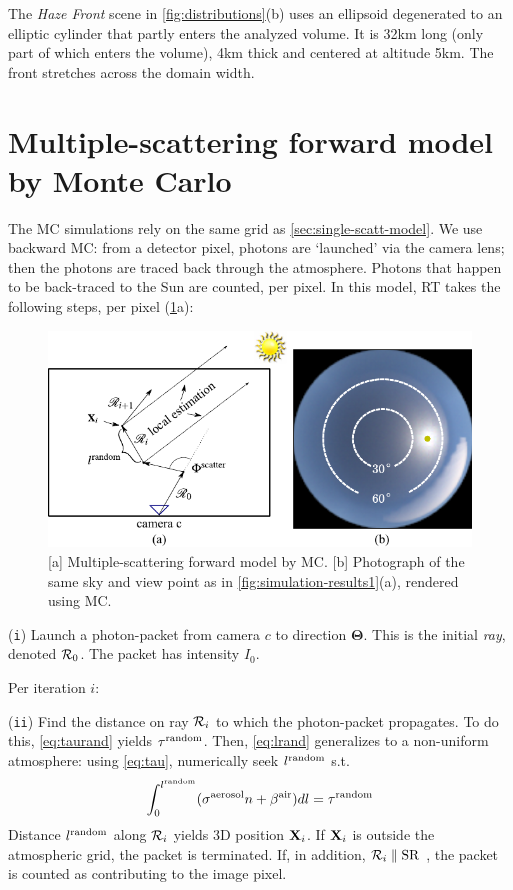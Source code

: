 \documentclass[10pt,letterpaper]{article}
\newcommand{\yoavcomment}[1]{}
\renewcommand{\yoavcomment}[1]{#1} %
\begin{document}
The {\em Haze Front} scene in \cref{fig:distributions}(b) uses an
ellipsoid degenerated to an elliptic cylinder that partly enters the
analyzed volume. It is 32km long (only part of which enters the
volume), 4km thick and centered at altitude 5km. The front stretches
across the domain width.

\section{Multiple-scattering forward model by Monte Carlo}
\label{sec:monte-carlo-simul}


The MC simulations rely on the same grid as
\cref{sec:single-scatt-model}. We use backward MC: from a detector
pixel, photons are `launched' via the camera lens; then the photons
are traced back through the atmosphere. Photons that happen to be
back-traced to the Sun are counted, per pixel. In this model, RT takes
the following steps, per pixel (\cref{fig:mcgrid}a):
\begin{figure}
  \centering
  \yoavcomment{\includegraphics{images/mcgrid.pdf}}
  \caption{\small [a] Multiple-scattering forward model by MC.
    [b] Photograph of the same sky and view point as in
    \cref{fig:simulation-results1}(a), rendered using MC.}
  \label{fig:mcgrid}
\end{figure}

\noindent ({\tt i}) Launch a photon-packet from camera $c$ to
direction ${\bm{\Theta}}$. This is the initial {\em ray}, denoted
${\cal R}_0$. The packet has intensity $I_0$.

\noindent Per iteration $i$:

\noindent ({\tt ii}) Find the distance on ray ${\cal R}_{i}$ to which
the photon-packet propagates. To do this, \cref{eq:taurand}
yields $\tau^{\rm random}$. Then, \cref{eq:lrand} generalizes to
a non-uniform atmosphere: using \cref{eq:tau}, numerically seek
$l^{\rm random}$ s.t.
\begin{align}
  \int_0^{l^{\rm random}}(\sigma^{\rm aerosol} n +\beta^{\rm air}) dl
  = \tau^{\rm random}
  \label{eq:MCextinct}
\end{align}
Distance $l^{\rm random}$ along ${\cal R}_{i}$ yields 3D position ${\bf
  X}_{i}$.  If ${\bf X}_{i}$ is outside the atmospheric grid, the
packet is terminated. If, in addition, ${\cal R}_{i}\parallel {\rm
  SR}$ , the packet is counted as contributing to the image pixel.
\end{document}
